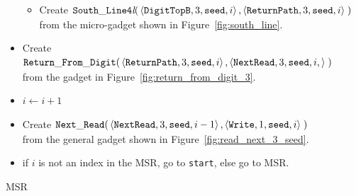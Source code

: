 \begin{itemize}
\begin{itemize}
        \item Create
        $\begin{aligned}[t]
            {\tt South\_Line4\textit{l}}(&\left\langle {\tt DigitTopB},  3, {\tt seed}, i \right\rangle,
                                          \left\langle {\tt ReturnPath}, 3, {\tt seed}, i \right\rangle \;)
        \end{aligned}$\\from the micro-gadget shown in Figure~\ref{fig:south_line}.
    \end{itemize}

    \item Create
    $\begin{aligned}[t]
        {\tt Return\_From\_Digit}(&\left\langle {\tt ReturnPath}, 3, {\tt seed}, i  \right\rangle,
                          \left\langle {\tt NextRead},   3, {\tt seed}, i, \right\rangle \;)
    \end{aligned}$\\from the gadget in Figure~\ref{fig:return_from_digit_3}.

    \item $i \gets i + 1$

    \item Create
    $\begin{aligned}[t]
        {\tt Next\_Read}(&\left\langle {\tt NextRead},  3, {\tt seed}, i - 1 \right\rangle,
                   \left\langle {\tt Write},     1, {\tt seed}, i     \right\rangle \;)
    \end{aligned}$\\ from the general gadget shown in Figure~\ref{fig:read_next_3_seed}.

    \item if $i$ is not an index in the MSR, go to {\tt start}, else go to MSR.
\end{itemize}

\vspace{1cm}




\Huge{MSR}\normalsize



